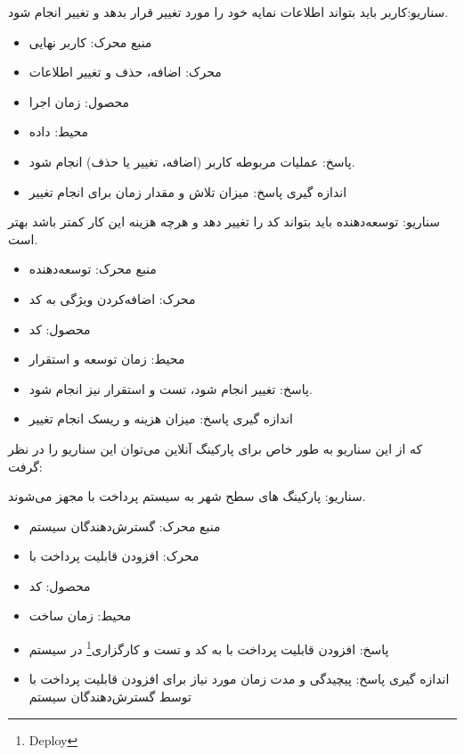 سناریو:کاربر باید بتواند اطلاعات نمایه خود را مورد تغییر قرار بدهد و تغییر انجام شود.
\begin{itemize}
\item
منبع محرک: کاربر نهایی
\item
محرک: اضافه، حذف و تغییر اطلاعات
\item
محصول: زمان اجرا
\item
محیط: داده
\item
پاسخ: عملیات مربوطه کاربر (اضافه، تغییر یا حذف) انجام شود. 
\item
اندازه گیری پاسخ:  میزان تلاش و مقدار زمان برای انجام تغییر
\end{itemize}

سناریو: توسعه‌دهنده باید بتواند کد را تغییر دهد و هرچه هزینه این کار کمتر باشد بهتر است. 
\begin{itemize}
\item
منبع محرک: توسعه‌دهنده
\item
محرک: اضافه‌کردن ویژگی‌ به کد
\item
محصول: کد
\item
محیط: زمان توسعه و استقرار
\item
پاسخ: تغییر انجام شود، تست و استقرار نیز انجام شود.
\item
اندازه گیری پاسخ: میزان هزینه و ریسک انجام تغییر
\end{itemize}
که از این سناریو به طور خاص برای پارکینگ آنلاین می‌توان این سناریو را در نظر گرفت:

سناریو: پارکینگ های سطح شهر به سیستم پرداخت با 
مجهز می‌شوند. 
\begin{itemize}
\item
منبع محرک: گسترش‌‌دهندگان سیستم
\item
محرک: افزودن قابلیت پرداخت با 
\item
محصول: کد
\item
محیط: زمان ساخت
\item
پاسخ: افزودن قابلیت پرداخت با  به کد و تست و کارگزاری\footnote{Deploy} در سیستم 
\item
اندازه گیری پاسخ: پیچیدگی و مدت زمان مورد نیاز برای افزودن قابلیت پرداخت با   توسط گسترش‌دهندگان سیستم 
\end{itemize}


